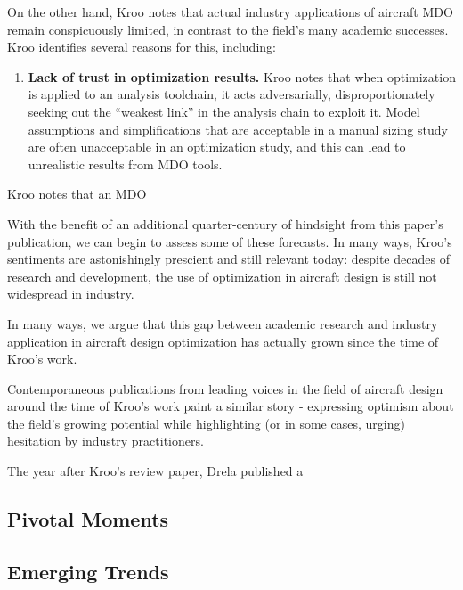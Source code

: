 \documentclass[12pt,vi,twoside]{article}
\begin{document}
    On the other hand, Kroo notes that actual industry applications of aircraft MDO remain conspicuously limited, in contrast to the field's many academic successes. Kroo identifies several reasons for this, including:
    \begin{enumerate}
        \item \textbf{Lack of trust in optimization results.} Kroo notes that when optimization is applied to an analysis toolchain, it acts adversarially, disproportionately seeking out the ``weakest link'' in the analysis chain to exploit it. Model assumptions and simplifications that are acceptable in a manual sizing study are often unacceptable in an optimization study, and this can lead to unrealistic results from MDO tools.
        \end{enumerate}

    Kroo notes that an MDO





    With the benefit of an additional quarter-century of hindsight from this paper's publication, we can begin to assess some of these forecasts. In many ways, Kroo's sentiments are astonishingly prescient and still relevant today: despite decades of research and development, the use of optimization in aircraft design is still not widespread in industry.

    In many ways, we argue that this gap between academic research and industry application in aircraft design optimization has actually grown since the time of Kroo's work.

    Contemporaneous publications from leading voices in the field of aircraft design around the time of Kroo's work paint a similar story - expressing optimism about the field's growing potential while highlighting (or in some cases, urging) hesitation by industry practitioners.

    The year after Kroo's review paper, Drela published a \cite{caughey_pros_1998}

    \subsection{Pivotal Moments}

    \subsection{Emerging Trends}
\end{document}
